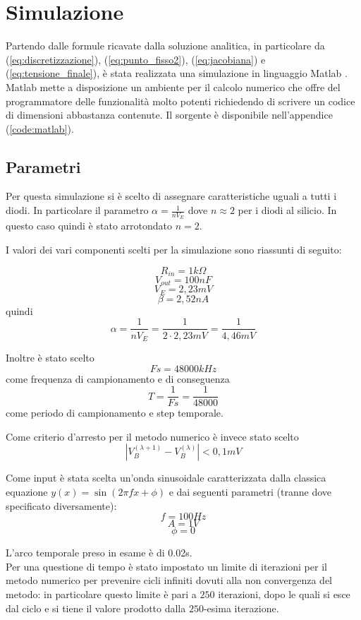 \chapter{Simulazione}
	Partendo dalle formule ricavate dalla soluzione analitica, in particolare da (\ref{eq:discretizzazione}), (\ref{eq:punto_fisso2}), (\ref{eq:jacobiana}) e (\ref{eq:tensione_finale}), è stata realizzata una simulazione in linguaggio Matlab \cite{matlab, matlab_book}. Matlab mette a disposizione un ambiente per il calcolo numerico che offre del programmatore delle funzionalità molto potenti richiedendo di scrivere un codice di dimensioni abbastanza contenute. Il sorgente è disponibile nell'appendice (\ref{code:matlab}).
	
	\section{Parametri}
		Per questa simulazione si è scelto di assegnare caratteristiche uguali a tutti i diodi. In particolare il parametro $\alpha = \frac{1}{nV_{E}}$ dove $n \approx 2$ per i diodi al silicio. In questo caso quindi è stato arrotondato $n = 2$.
	
		I valori dei vari componenti scelti per la simulazione sono riassunti di seguito:
	
		\[
			R_{in} = 1k\Omega
		\]
		\[
			V_{out} = 100nF
		\]
		\[
			V_{E} = 2,23mV
		\]
		\[
			\beta = 2,52nA
		\]
		quindi
		\[
			\alpha = \frac{1}{nV_{E}} = \frac{1}{2 \cdot 2,23mV} = \frac{1}{4,46mV}
		\]
	
		Inoltre è stato scelto
		\[
			Fs = 48000kHz
		\]
		come frequenza di campionamento e di conseguenza
		\[
			T = \frac{1}{Fs} = \frac{1}{48000}
		\]
		come periodo di campionamento e step temporale.
		
		Come criterio d'arresto per il metodo numerico è invece stato scelto
		\[
			|V_{B}^{(\lambda+1)} - V_{B}^{(\lambda)}| < 0,1mV
		\]
	
		Come input è stata scelta un'onda sinusoidale caratterizzata dalla classica equazione $y(x) = \sin (2 \pi f x + \phi)$ e dai seguenti parametri (tranne dove specificato diversamente):
		\[
			f = 100Hz
		\]
		\[
			A = 1V
		\]
		\[
			\phi = 0
		\]
		
		\vspace{10px}
		L'arco temporale preso in esame è di 0.02s.\\
		
		Per una questione di tempo è stato impostato un limite di iterazioni per il metodo numerico per prevenire cicli infiniti dovuti alla non convergenza del metodo: in particolare questo limite è pari a $250$ iterazioni, dopo le quali si esce dal ciclo e si tiene il valore prodotto dalla $250$-esima iterazione.
	\pagebreak
	
